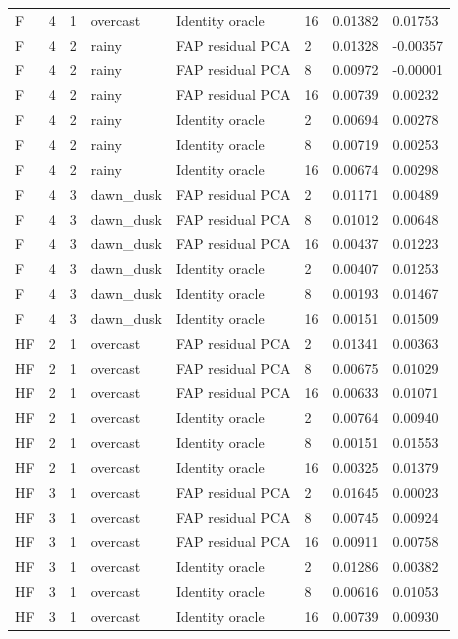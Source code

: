 \begin{tabular}{llllllll}
F & 4 & 1 & overcast & Identity oracle & 16 & 0.01382 & 0.01753 \\
F & 4 & 2 & rainy & FAP residual PCA & 2 & 0.01328 & -0.00357 \\
F & 4 & 2 & rainy & FAP residual PCA & 8 & 0.00972 & -0.00001 \\
F & 4 & 2 & rainy & FAP residual PCA & 16 & 0.00739 & 0.00232 \\
F & 4 & 2 & rainy & Identity oracle & 2 & 0.00694 & 0.00278 \\
F & 4 & 2 & rainy & Identity oracle & 8 & 0.00719 & 0.00253 \\
F & 4 & 2 & rainy & Identity oracle & 16 & 0.00674 & 0.00298 \\
F & 4 & 3 & dawn\_dusk & FAP residual PCA & 2 & 0.01171 & 0.00489 \\
F & 4 & 3 & dawn\_dusk & FAP residual PCA & 8 & 0.01012 & 0.00648 \\
F & 4 & 3 & dawn\_dusk & FAP residual PCA & 16 & 0.00437 & 0.01223 \\
F & 4 & 3 & dawn\_dusk & Identity oracle & 2 & 0.00407 & 0.01253 \\
F & 4 & 3 & dawn\_dusk & Identity oracle & 8 & 0.00193 & 0.01467 \\
F & 4 & 3 & dawn\_dusk & Identity oracle & 16 & 0.00151 & 0.01509 \\
HF & 2 & 1 & overcast & FAP residual PCA & 2 & 0.01341 & 0.00363 \\
HF & 2 & 1 & overcast & FAP residual PCA & 8 & 0.00675 & 0.01029 \\
HF & 2 & 1 & overcast & FAP residual PCA & 16 & 0.00633 & 0.01071 \\
HF & 2 & 1 & overcast & Identity oracle & 2 & 0.00764 & 0.00940 \\
HF & 2 & 1 & overcast & Identity oracle & 8 & 0.00151 & 0.01553 \\
HF & 2 & 1 & overcast & Identity oracle & 16 & 0.00325 & 0.01379 \\
HF & 3 & 1 & overcast & FAP residual PCA & 2 & 0.01645 & 0.00023 \\
HF & 3 & 1 & overcast & FAP residual PCA & 8 & 0.00745 & 0.00924 \\
HF & 3 & 1 & overcast & FAP residual PCA & 16 & 0.00911 & 0.00758 \\
HF & 3 & 1 & overcast & Identity oracle & 2 & 0.01286 & 0.00382 \\
HF & 3 & 1 & overcast & Identity oracle & 8 & 0.00616 & 0.01053 \\
HF & 3 & 1 & overcast & Identity oracle & 16 & 0.00739 & 0.00930 \\

\end{tabular}
